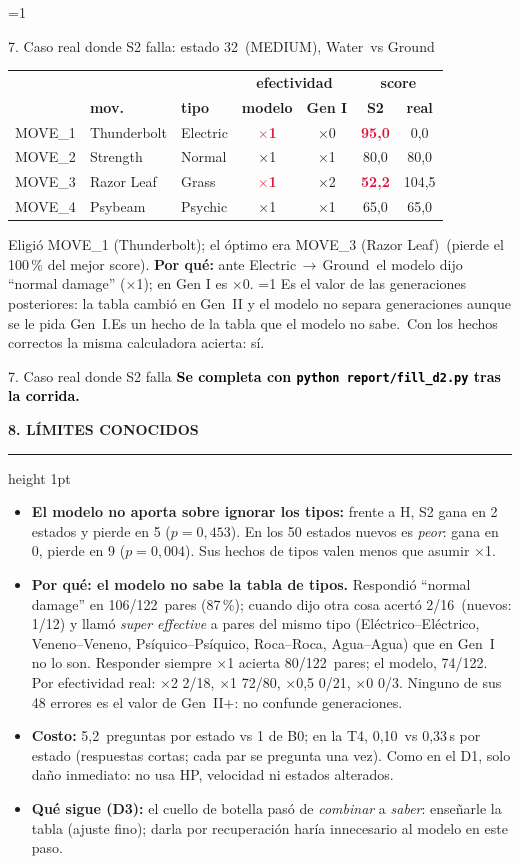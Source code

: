 \documentclass[10pt,a4paper]{extarticle}
\newcommand{\ph}[1]{\colorbox{yellow!60}{\textcolor{black}{\textbf{#1}}}}
\newcommand{\callsStwo}{5{,}2}
\newcommand{\constOne}{80/122}
\newcommand{\factPairs}{122}
\newcommand{\factRight}{74}
\newcommand{\fcAtk}{Electric}
\newcommand{\fcChosen}{MOVE\_1 (Thunderbolt)}
\newcommand{\fcDef}{Ground}
\newcommand{\fcDiff}{MEDIUM}
\newcommand{\fcEnemy}{Ground}
\newcommand{\fcFixed}{s\'i}
\newcommand{\fcId}{32}
\newcommand{\fcIsModern}{0}
\newcommand{\fcModel}{1}
\newcommand{\fcOptimal}{MOVE\_3 (Razor Leaf)}
\newcommand{\fcPlayer}{Water}
\newcommand{\fcRegret}{100}
\newcommand{\fcSaid}{normal damage}
\newcommand{\fcTable}{MOVE\_1 & Thunderbolt & Electric & \textcolor{crimson}{\textbf{$\times$1}} & $\times$0 & \textcolor{crimson}{\textbf{95{,}0}} & 0{,}0\\
MOVE\_2 & Strength & Normal & $\times$1 & $\times$1 & 80{,}0 & 80{,}0\\
MOVE\_3 & Razor Leaf & Grass & \textcolor{crimson}{\textbf{$\times$1}} & $\times$2 & \textcolor{crimson}{\textbf{52{,}2}} & 104{,}5\\
MOVE\_4 & Psybeam & Psychic & $\times$1 & $\times$1 & 65{,}0 & 65{,}0\\}
\newcommand{\fcTruth}{0}
\newcommand{\genBullet}{Ninguno de sus 48 errores es el valor de Gen~II+: no confunde generaciones.}
\newcommand{\hasFailure}{1}
\newcommand{\neutralPct}{87}
\newcommand{\neutralShare}{106/122}
\newcommand{\nonNeutral}{2/16}
\newcommand{\nonNeutralH}{1/12}
\newcommand{\recallHalf}{0/21}
\newcommand{\recallOne}{72/80}
\newcommand{\recallTwo}{2/18}
\newcommand{\recallZero}{0/3}
\newcommand{\sameSuper}{El\'ectrico--El\'ectrico, Veneno--Veneno, Ps\'iquico--Ps\'iquico, Roca--Roca, Agua--Agua}
\newcommand{\secsBaseH}{0{,}33}
\newcommand{\secsStwoH}{0{,}10}
\newcommand{\verdictSH}{\textbf{El modelo no aporta sobre ignorar los tipos:} frente a H, S2 gana en 2 estados y pierde en 5 ($p=0{,}453$). En los 50 estados nuevos es \emph{peor}: gana en 0, pierde en 9 ($p=0{,}004$). Sus hechos de tipos valen menos que asumir $\times$1.}
\newcommand{\heading}[1]{%
  \par\vspace{1.2mm}\noindent
  {\color{navy}\bfseries\small\MakeUppercase{#1}}\par\vspace{0.5mm}
  {\color{amber}\hrule height 1pt}\vspace{0.9mm}\noindent\ignorespaces}
\begin{document}
\begin{minipage}[t]{0.488\linewidth}
\vspace{0.7mm}
\ifnum\hasFailure=1
\begin{failbox}{7. Caso real donde S2 falla: estado \fcId\ (\fcDiff), \fcPlayer\ vs \fcEnemy}
{\centering\scriptsize
\begin{tabular}{@{}lllcccc@{}}
& & & \multicolumn{2}{c}{\textbf{efectividad}} & \multicolumn{2}{c}{\textbf{score}}\\
& \textbf{mov.} & \textbf{tipo} & \textbf{modelo} & \textbf{Gen I} & \textbf{S2} & \textbf{real}\\
\midrule
\fcTable
\end{tabular}\par}
\vspace{0.2mm}
{\footnotesize Eligi\'o \fcChosen; el \'optimo era \fcOptimal\ (pierde el \fcRegret\,\% del mejor score). \textbf{Por qu\'e:} ante \fcAtk\,$\to$\,\fcDef\ el modelo dijo ``\fcSaid'' ($\times$\fcModel); en Gen I es $\times$\fcTruth.
\ifnum\fcIsModern=1 Es el valor de las generaciones posteriores: la tabla cambi\'o en Gen~II y el modelo no separa generaciones aunque se le pida Gen~I.\else Es un hecho de la tabla que el modelo no sabe.\fi\ Con los hechos correctos la misma calculadora acierta: \fcFixed.}
\end{failbox}
\else
\begin{failbox}{7. Caso real donde S2 falla}
\footnotesize \ph{Se completa con \texttt{python report/fill\_d2.py} tras la corrida.}
\end{failbox}
\fi

\heading{8. L\'imites conocidos}
\begin{itemize}
\item \verdictSH
\item \textbf{Por qu\'e: el modelo no sabe la tabla de tipos.} Respondi\'o ``normal damage'' en \neutralShare\ pares (\neutralPct\,\%); cuando dijo otra cosa acert\'o \nonNeutral\ (nuevos: \nonNeutralH) y llam\'o \emph{super effective} a pares del mismo tipo (\sameSuper) que en Gen~I no lo son. Responder siempre $\times$1 acierta \constOne\ pares; el modelo, \factRight/\factPairs. Por efectividad real: $\times$2 \recallTwo, $\times$1 \recallOne, $\times$0{,}5 \recallHalf, $\times$0 \recallZero. \genBullet
\item \textbf{Costo:} \callsStwo\ preguntas por estado vs 1 de B0; en la T4, \secsStwoH\ vs \secsBaseH\,s por estado (respuestas cortas; cada par se pregunta una vez). Como en el D1, solo da\~no inmediato: no usa HP, velocidad ni estados alterados.
\item \textbf{Qu\'e sigue (D3):} el cuello de botella pas\'o de \emph{combinar} a \emph{saber}: ense\~narle la tabla (ajuste fino); darla por recuperaci\'on har\'ia innecesario al modelo en este paso.
\end{itemize}
\end{minipage}
\end{document}
